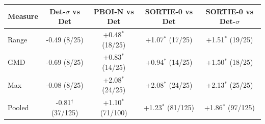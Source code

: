 \begin{tabular}{lcccc}
\toprule
Measure & Det-$\sigma$ vs Det & PBOI-N vs Det & SORTIE-0 vs Det & SORTIE-0 vs Det-$\sigma$ \\
\midrule
Range & -0.49 (8/25) & +0.48$^\ast$ (18/25) & +1.07$^\ast$ (17/25) & +1.51$^\ast$ (19/25) \\
GMD & -0.69 (8/25) & +0.83$^\ast$ (14/25) & +0.94$^\ast$ (14/25) & +1.50$^\ast$ (18/25) \\
Max & -0.08 (8/25) & +2.08$^\ast$ (24/25) & +2.08$^\ast$ (24/25) & +2.13$^\ast$ (25/25) \\
Pooled & -0.81$^\dagger$ (37/125) & +1.10$^\ast$ (71/100) & +1.23$^\ast$ (81/125) & +1.86$^\ast$ (97/125) \\
\bottomrule
\end{tabular}
